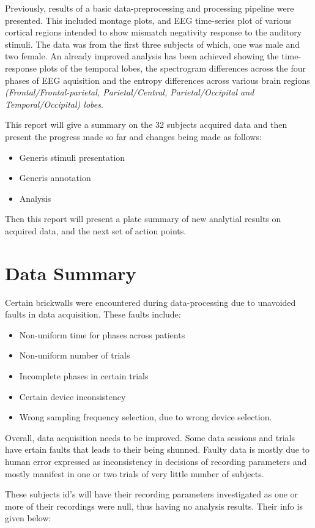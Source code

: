 \documentclass[conference]{IEEEconf}
\begin{document}
Previously, results of a basic data-preprocessing and processing pipeline were presented. This included montage plots, and EEG time-series plot of various
cortical regions intended to show mismatch negativity response to the auditory stimuli. The data was from the first three subjects of which, one was male and two female.
An already improved analysis has been achieved showing the time-response plots of the temporal lobes,
the spectrogram differences across the four phases of EEG aquisition and the entropy differences across
various brain regions \textit{(Frontal/Frontal-parietal, Parietal/Central, Parietal/Occipital and Temporal/Occipital) lobes}.

This report will give a summary on the 32 subjects acquired data and then present the progress made so far and changes being made as follows:
  \begin{itemize}
    \item Generis stimuli presentation
    \item Generis annotation
    \item Analysis
  \end{itemize}
Then this report will present a plate summary of new analytial results on acquired data, and the next set of action points.

\section{Data Summary}
Certain brickwalls were encountered during data-processing due to unavoided faults in data acquisition. These faults include:
\begin{itemize}
  \item Non-uniform time for phases across patients
  \item Non-uniform number of trials
  \item Incomplete phases in certain trials
  \item Certain device inconsistency
  \item Wrong sampling frequency selection, due to wrong device selection.
\end{itemize}
Overall, data acquisition needs to be improved. Some data sessions and trials have ertain faults that
leads to their being shunned.
Faulty data is mostly due to human error expressed as inconsistency in decisions of recording
parameters and mostly manifest in one or two trials of very little number of subjects.

These subjects id's will have their recording parameters investigated as one or more of their
recordings were null, thus having no analysis results. Their info is given below:
\end{document}
